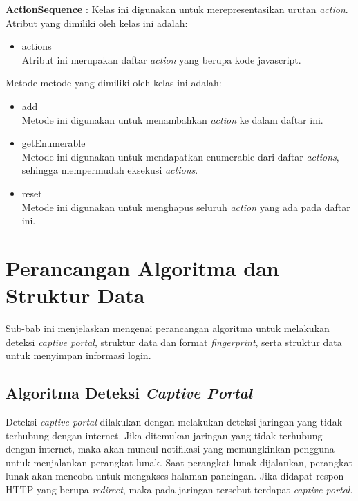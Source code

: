 \par{\textbf{ActionSequence} : Kelas ini digunakan untuk merepresentasikan urutan \textit{action}. Atribut yang dimiliki oleh kelas ini adalah:
    \begin{itemize}
        \item{actions\\Atribut ini merupakan daftar \textit{action} yang berupa kode javascript.}
    \end{itemize}
    Metode-metode yang dimiliki oleh kelas ini adalah:
    \begin{itemize}
        \item{add\\Metode ini digunakan untuk menambahkan \textit{action} ke dalam daftar ini.}
        \item{getEnumerable\\Metode ini digunakan untuk mendapatkan enumerable dari daftar \textit{actions}, sehingga mempermudah eksekusi \textit{actions}.}
        \item{reset\\Metode ini digunakan untuk menghapus seluruh \textit{action} yang ada pada daftar ini.}
    \end{itemize}
}



\section{Perancangan Algoritma dan Struktur Data}
\label{sec:perancangan_algoritma_dan_struktur_data}

Sub-bab ini menjelaskan mengenai perancangan algoritma untuk melakukan deteksi \textit{captive portal}, struktur data dan format \textit{fingerprint}, serta struktur data untuk menyimpan informasi login.

\subsection{Algoritma Deteksi \textit{Captive Portal}}
\label{subsec:algoritma_deteksi_captive_portal}

Deteksi \textit{captive portal} dilakukan dengan melakukan deteksi jaringan yang tidak terhubung dengan internet. Jika ditemukan jaringan yang tidak terhubung dengan internet, maka akan muncul notifikasi yang memungkinkan pengguna untuk menjalankan perangkat lunak. Saat perangkat lunak dijalankan, perangkat lunak akan mencoba untuk mengakses halaman pancingan. Jika didapat respon HTTP yang berupa \textit{redirect}, maka pada jaringan tersebut terdapat \textit{captive portal}.


